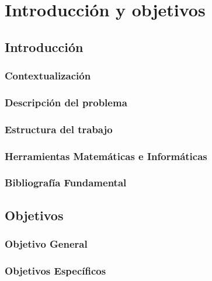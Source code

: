 \chapter{Introducción y objetivos}

\section{Introducción}
\subsection{Contextualización}
\subsection{Descripción del problema}
\subsection{Estructura del trabajo}
\subsection{Herramientas Matemáticas e Informáticas}
\subsection{Bibliografía Fundamental}

\section{Objetivos}
\subsection{Objetivo General}
\subsection{Objetivos Específicos}